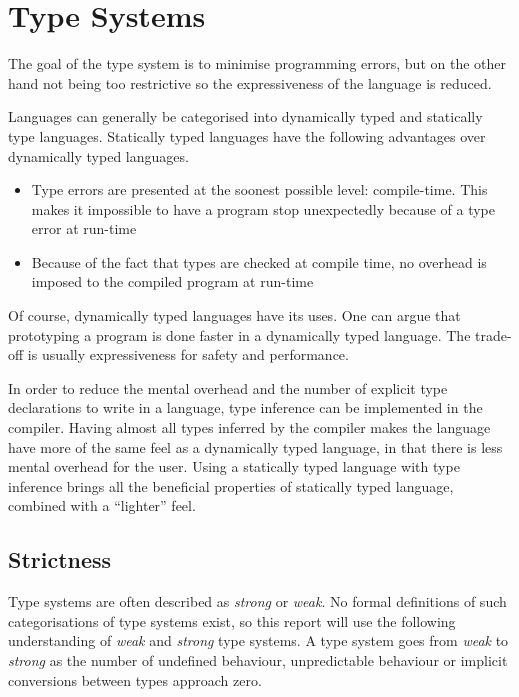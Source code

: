 \section{Type Systems}

The goal of the type system is to minimise programming errors, but on the other hand not being too restrictive so the expressiveness of the language is reduced. 

Languages can generally be categorised into dynamically typed and statically type languages. Statically typed languages have the following advantages over dynamically typed languages.

\begin{itemize}
  \item Type errors are presented at the soonest possible level: compile-time. This makes it impossible to have a program stop unexpectedly because of a type error at run-time
  \item Because of the fact that types are checked at compile time, no overhead is imposed to the compiled program at run-time
\end{itemize}

Of course, dynamically typed languages have its uses. One can argue that prototyping a program is done faster in a dynamically typed language. The trade-off is usually expressiveness for safety and performance.

In order to reduce the mental overhead and the number of explicit type declarations to write in a language, type inference can be implemented in the compiler. Having almost all types inferred by the compiler makes the language have more of the same feel as a dynamically typed language, in that there is less mental overhead for the user. Using a statically typed language with type inference brings all the beneficial properties of statically typed language, combined with a \enquote{lighter} feel.

\subsection{Strictness}

Type systems are often described as \emph{strong} or \emph{weak}. No formal definitions of such categorisations of type systems exist, so this report will use the following understanding of \emph{weak} and \emph{strong} type systems. A type system goes from \emph{weak} to \emph{strong} as the number of undefined behaviour, unpredictable behaviour or implicit conversions between types approach zero.

